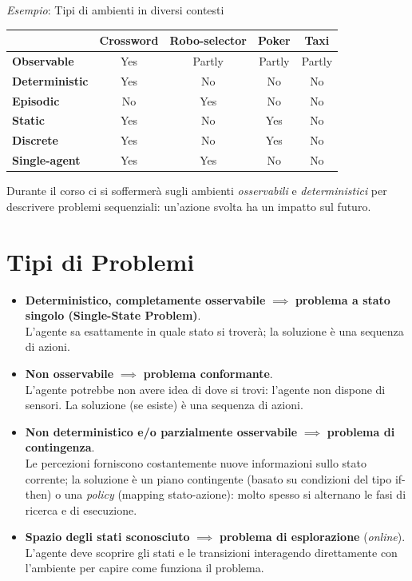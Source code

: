 \documentclass[a4paper, 11pt, oneside]{book}
\theoremstyle{definition}
\begin{document}
	\emph{Esempio}: Tipi di ambienti in diversi contesti
	\begin{table}[h]
		\centering
		\begin{tabular}{|l|c|c|c|c|}
			\hline
											& Crossword & Robo-selector & Poker  & Taxi   \\
			\hline
			\textbf{Observable}    & Yes       & Partly        & Partly & Partly \\
			\hline
			\textbf{Deterministic} & Yes       & No            & No     & No     \\
			\hline
			\textbf{Episodic}      & No        & Yes           & No     & No     \\
			\hline
			\textbf{Static}        & Yes       & No            & Yes    & No     \\
			\hline
			\textbf{Discrete}      & Yes       & No            & Yes    & No     \\
			\hline
			\textbf{Single-agent}  & Yes       & Yes           & No     & No     \\
			\hline
		\end{tabular}
	\end{table}

	Durante il corso ci si soffermer\`a sugli ambienti \emph{osservabili} e \emph{deterministici}
	per descrivere problemi sequenziali: un'azione svolta ha un impatto sul futuro.

	\section{Tipi di Problemi}
	\begin{itemize}
		\item \textbf{Deterministico, completamente osservabile} $\implies$ \textbf{problema
			a stato singolo (Single-State Problem)}. \\L'agente sa esattamente in quale
			stato si trover\`a; la soluzione \`e una sequenza di azioni.

		\item \textbf{Non osservabile} $\implies$ \textbf{problema conformante}. \\L'agente
			potrebbe non avere idea di dove si trovi: l'agente non dispone di sensori.
			La soluzione (se esiste) \`e una sequenza di azioni.

		\item \textbf{Non deterministico e/o parzialmente osservabile} $\implies$
			\textbf{problema di contingenza}. \\Le percezioni forniscono costantemente
			nuove informazioni sullo stato corrente; la soluzione \`e un piano
			contingente (basato su condizioni del tipo if-then)
			o una \textit{policy} (mapping stato-azione): molto spesso si alternano
			le fasi di ricerca e di esecuzione.

		\item \textbf{Spazio degli stati sconosciuto} $\implies$ \textbf{problema di
			esplorazione} (\textit{online}). \\L'agente deve scoprire gli stati e le
			transizioni interagendo direttamente con l'ambiente per capire come funziona
			il problema.
	\end{itemize}
\end{document}
